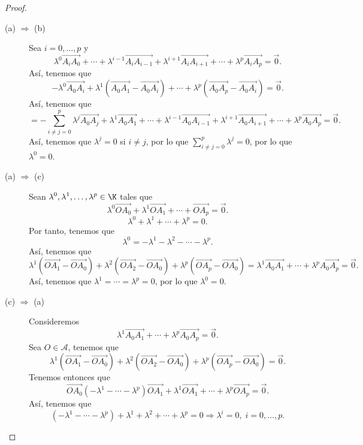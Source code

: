 \begin{proof}
\begin{description}
\item[(a) $\displaystyle \Rightarrow $ (b)] Sea $\displaystyle i = 0, \ldots, p $ y
	\[ \lambda^{0}\overrightarrow{A_{i}A_{0}} +  \cdots  + \lambda^{i-1} \overrightarrow{A_{i}A_{i - 1}} + \lambda^{i+1} \overrightarrow{A_{i}A_{i+1}} +  \cdots  + \lambda^{p} \overrightarrow{A_{i}A_{p}} = \vec{0} .\]
	Así, tenemos que
	\[ - \lambda^{0}\overrightarrow{A_{0}A_{i}} + \lambda^{1}\left(\overrightarrow{A_{0}A_{1}}-\overrightarrow{A_{0}A_{i}}\right) + \cdots + \lambda^{p}\left(\overrightarrow{A_{0}A_{p}} - \overrightarrow{A_{0}A_{i}}\right) = \vec{0} .\]
Así, tenemos que
\[ = - \sum^{p}_{i \neq j = 0}\lambda^{j}\overrightarrow{A_{0}A_{j}} + \lambda^{1}\overrightarrow{A_{0}A_{1}} + \cdots + \lambda^{i-1}\overrightarrow{A_{0}A_{i-1}} + \lambda^{i+1}\overrightarrow{A_{0}A_{i+1}}+ \cdots + \lambda^{p}\overrightarrow{A_{0}A_{p}} = \vec{0}.\]
Así, tenemos que $\displaystyle \lambda^{j} = 0 $ si $\displaystyle i \neq j $, por lo que $\displaystyle \sum^{p}_{i \neq j=0}\lambda^{j}= 0 $, por lo que $\displaystyle \lambda^{0} = 0 $.
\item[(a) $\displaystyle \Rightarrow $ (c)] Sean $\displaystyle \lambda^{0}, \lambda^{1}, \ldots, \lambda^{p} \in \K $ tales que  
\[ \lambda^{0}\overrightarrow{OA_{0}} + \lambda^{1}\overrightarrow{OA_{1}} + \cdots + \overrightarrow{OA_{p}} = \vec{0}.\]
			\[\lambda^{0} + \lambda^{1} + \cdots + \lambda^{p} = 0 .\]
Por tanto, tenemos que 
\[\lambda^{0} = - \lambda^{1}-\lambda^{2}-\cdots - \lambda^{p} .\]
Así, tenemos que 
\[\lambda^{1}\left(\overrightarrow{OA_{1}}-\overrightarrow{OA_{0}}\right) + \lambda^{2}\left(\overrightarrow{OA_{2}}-\overrightarrow{OA_{0}}\right) + \lambda^{p}\left(\overrightarrow{OA_{p}}-\overrightarrow{OA_{0}}\right) = \lambda^{1}\overrightarrow{A_{0}A_{1}} + \cdots + \lambda^{p}\overrightarrow{A_{0}A_{p}} = \vec{0} .\]
Así, tenemos que $\displaystyle \lambda^{1} = \cdots = \lambda^{p} = 0 $, por lo que $\displaystyle \lambda^{0} = 0 $.
\item[(c) $\displaystyle \Rightarrow $ (a)] Consideremos 
	\[ \lambda^{1}\overrightarrow{A_{0}A_{1}} + \cdots + \lambda^{p}\overrightarrow{A_{0}A_{p}} = \vec{0}.\]
	Sea $\displaystyle O \in \mathcal{A} $, tenemos que 
	\[ \lambda^{1}\left(\overrightarrow{OA_{1}}-\overrightarrow{OA_{0}}\right) + \lambda^{2}\left(\overrightarrow{OA_{2}}-\overrightarrow{OA_{0}}\right) + \lambda^{p}\left(\overrightarrow{OA_{p}}-\overrightarrow{OA_{0}}\right) = \vec{0}.\]
Tenemos entonces que
\[ \overrightarrow{OA_{0}} \left(-\lambda^{1}-\cdots -\lambda^{p}\right) \overrightarrow{OA_{1}} + \lambda^{1}\overrightarrow{OA_{1}} + \cdots + \lambda^{p}\overrightarrow{OA_{p}} = \vec{0}.\]
Así, tenemos que 
\[ \left(-\lambda^{1} - \cdots - \lambda^{p}\right) + \lambda^{1}+\lambda^{2} +\cdots + \lambda^{p}=0 \Rightarrow \lambda^{i} = 0, \; i = 0, \ldots, p .\]
\end{description}
\end{proof}

